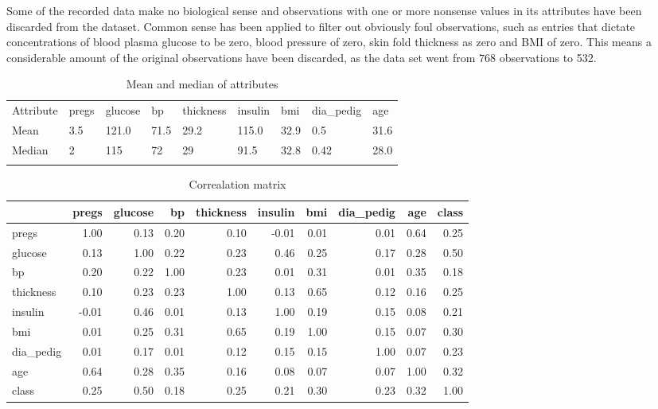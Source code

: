 Some of the recorded data make no biological sense and observations with one or
more nonsense values in its attributes have been discarded from the dataset.
Common sense has been applied to filter out obviously foul observations, such
as entries that dictate concentrations of blood plasma glucose to be zero, blood
pressure of zero, skin fold thickness as zero and BMI of zero. This means a
considerable amount of the original observations have been discarded, as the
data set went from 768 observations to 532.
\bigskip

\begin{table}[]
\centering
\caption{Mean and median of attributes}
\label{my-label}
\begin{tabular}{lllllllll}
\cline{1-1}
\multicolumn{1}{|l|}{Attribute} & pregs & glucose & bp   & thickness & insulin & bmi  & dia\_pedig & age  \\ \cline{1-1}
\multicolumn{1}{|l|}{Mean}      & 3.5   & 121.0   & 71.5 & 29.2      & 115.0   & 32.9 & 0.5        & 31.6 \\ \cline{1-1}
\multicolumn{1}{|l|}{Median}    & 2     & 115     & 72   & 29        & 91.5    & 32.8 & 0.42       & 28.0 \\ \cline{1-1}
                                                       &       &         &      &           &         &      &            &      \\ \hline
\end{tabular}
\end{table}

\begin{table}
\caption{Correalation matrix}
\begin{tabular}{lrrrrrrrrr}
\toprule
{} &  pregs &  glucose &    bp &  thickness &  insulin &   bmi &  dia\_pedig &   age &  class \\
\midrule
pregs     &   1.00 &     0.13 &  0.20 &       0.10 &    -0.01 &  0.01 &       0.01 &  0.64 &   0.25 \\
glucose   &   0.13 &     1.00 &  0.22 &       0.23 &     0.46 &  0.25 &       0.17 &  0.28 &   0.50 \\
bp        &   0.20 &     0.22 &  1.00 &       0.23 &     0.01 &  0.31 &       0.01 &  0.35 &   0.18 \\
thickness &   0.10 &     0.23 &  0.23 &       1.00 &     0.13 &  0.65 &       0.12 &  0.16 &   0.25 \\
insulin   &  -0.01 &     0.46 &  0.01 &       0.13 &     1.00 &  0.19 &       0.15 &  0.08 &   0.21 \\
bmi       &   0.01 &     0.25 &  0.31 &       0.65 &     0.19 &  1.00 &       0.15 &  0.07 &   0.30 \\
dia\_pedig &   0.01 &     0.17 &  0.01 &       0.12 &     0.15 &  0.15 &       1.00 &  0.07 &   0.23 \\
age       &   0.64 &     0.28 &  0.35 &       0.16 &     0.08 &  0.07 &       0.07 &  1.00 &   0.32 \\
class     &   0.25 &     0.50 &  0.18 &       0.25 &     0.21 &  0.30 &       0.23 &  0.32 &   1.00 \\
\bottomrule
\end{tabular}
\end{table}
